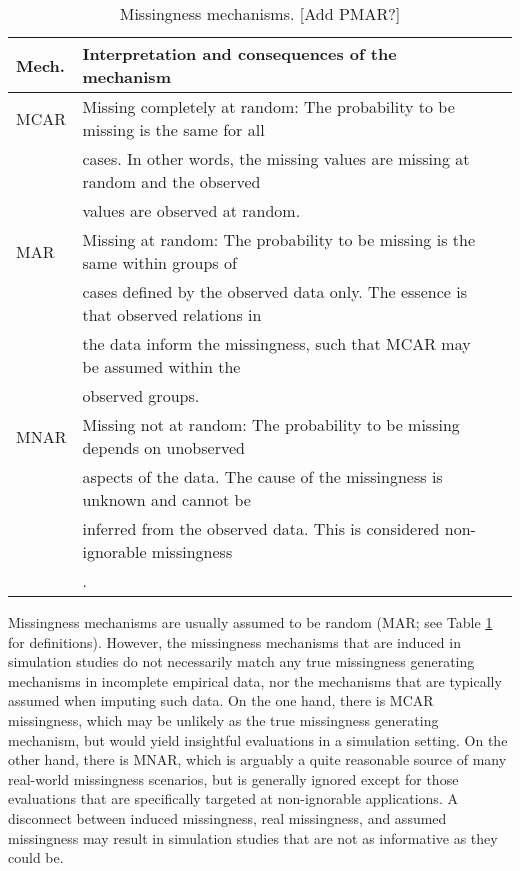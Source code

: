 \documentclass[bimj,fleqn]{w-art}
\begin{document}
\begin{table}[tb]
\begin{center}
\caption{Missingness mechanisms. [Add PMAR?]}
\label{table:mech}
\begin{tabular}{lll}
\hline
Mech. & Interpretation and consequences of the mechanism \\
\hline  
MCAR  & Missing completely at random: The probability to be missing is the same for all \\
      & cases. In other words, the missing values are missing at random and the observed \\
      & values are observed at random. \\
MAR   & Missing at random: The probability to be missing is the same within groups of \\
      & cases defined by the observed data only. The essence is that observed relations in \\
      & the data inform the missingness, such that MCAR may be assumed within the \\ 
      & observed groups. \\
MNAR  & Missing not at random: The probability to be missing depends on unobserved \\
      & aspects of the data. The cause of the missingness is unknown and cannot be \\ 
      & inferred from the observed data. This is considered non-ignorable missingness \\
      & \citep[see e.g.][]{rubi76}. \\
\hline
\end{tabular}
\end{center}
\end{table}

Missingness mechanisms are usually assumed to be random (MAR; see Table \ref{table:mech} for definitions). However, the missingness mechanisms that are induced in simulation studies do not necessarily match any true missingness generating mechanisms in incomplete empirical data, nor the mechanisms that are typically assumed when imputing such data. On the one hand, there is MCAR missingness, which may be unlikely as the true missingness generating mechanism, but would yield insightful evaluations in a simulation setting. On the other hand, there is MNAR, which is arguably a quite reasonable source of many real-world missingness scenarios, but is generally ignored except for those evaluations that are specifically targeted at non-ignorable applications. A disconnect between induced missingness, real missingness, and assumed missingness may result in simulation studies that are not as informative as they could be. 
\end{document}
